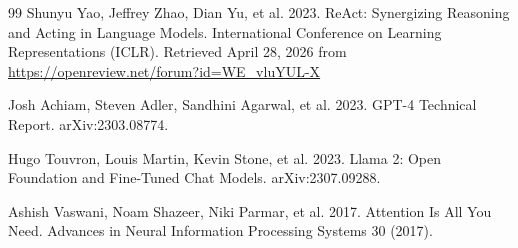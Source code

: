 \documentclass[sigconf]{acmart}
\begin{document}
\begin{thebibliography}{99}
Shunyu Yao, Jeffrey Zhao, Dian Yu, et al. 2023. ReAct: Synergizing Reasoning and Acting in Language Models. International Conference on Learning Representations (ICLR). Retrieved April 28, 2026 from \url{https://openreview.net/forum?id=WE_vluYUL-X}

Josh Achiam, Steven Adler, Sandhini Agarwal, et al. 2023. GPT-4 Technical Report. arXiv:2303.08774.

Hugo Touvron, Louis Martin, Kevin Stone, et al. 2023. Llama 2: Open Foundation and Fine-Tuned Chat Models. arXiv:2307.09288.

Ashish Vaswani, Noam Shazeer, Niki Parmar, et al. 2017. Attention Is All You Need. Advances in Neural Information Processing Systems 30 (2017).

\end{thebibliography}
\end{document}
